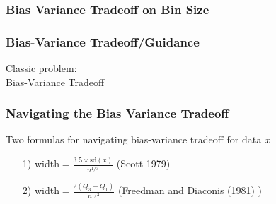 \documentclass{beamer}
\numberwithin{equation}{section}
\begin{document}
\begin{frame}
\frametitle{Bias Variance Tradeoff on Bin Size}

\begin{center}
\end{center}


\end{frame}


\begin{frame}
\frametitle{Bias-Variance Tradeoff/Guidance}

Classic problem: \\
\alert{Bias-Variance} Tradeoff


\begin{center}
\end{center}



\end{frame}


\begin{frame}
\frametitle{Navigating the Bias Variance Tradeoff}

Two formulas for navigating bias-variance tradeoff for data $x$


\begin{itemize}
\item[1)] width$ = \frac{3.5 \times \text{sd}(x)}{n^{1/3}} $  (Scott 1979) 
\item[2)] width$ = \frac{2 (Q_{3} - Q_{1}) }{n^{1/3} } $ (Freedman and Diaconis (1981) )
\end{itemize}


\end{frame}
\end{document}
